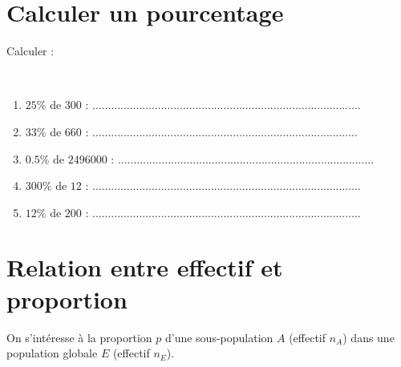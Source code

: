 	\section{Calculer un pourcentage}
	Calculer :
	\begin{questions}
		
	
		\question[5] \ 
		
		\begin{enumerate}[label=\alph*)]
			
			\item $25 \%$ de $\num{300}$ :  ......................................................................................
			\item $33 \%$ de $\num{660}$ : .....................................................................................
			\item $\num{0.5} \%$ de $\num{2496000}$ : ..................................................................................
			\item $300 \%$ de $\num{12}$ : ......................................................................................
			\item $12 \%$ de $\num{200}$ : ......................................................................................
		\end{enumerate}
	\end{questions}
	
	
\section{Relation entre effectif et proportion}

On s'intéresse à la proportion $p$ d'une sous-population $A$ (effectif $n_A$) dans une population globale $E$ (effectif $n_E$).

